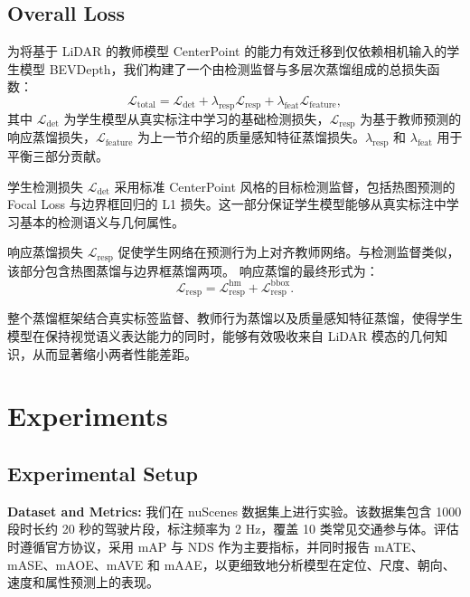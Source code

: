 \documentclass[12pt, UTF8]{ctexart}
\begin{document}
\subsection{Overall Loss}

为将基于 LiDAR 的教师模型 CenterPoint 的能力有效迁移到仅依赖相机输入的学生模型 BEVDepth，我们构建了一个由检测监督与多层次蒸馏组成的总损失函数：
\begin{equation}
\mathcal{L}_{\text{total}}
=
\mathcal{L}_{\text{det}}
+
\lambda_{\text{resp}}
\mathcal{L}_{\text{resp}}
+
\lambda_{\text{feat}}
\mathcal{L}_{\text{feature}},
\end{equation}
其中 $\mathcal{L}_{\text{det}}$ 为学生模型从真实标注中学习的基础检测损失，$\mathcal{L}_{\text{resp}}$ 为基于教师预测的响应蒸馏损失，$\mathcal{L}_{\text{feature}}$ 为上一节介绍的质量感知特征蒸馏损失。$\lambda_{\text{resp}}$ 和 $\lambda_{\text{feat}}$ 用于平衡三部分贡献。


学生检测损失 $\mathcal{L}_{\text{det}}$ 采用标准 CenterPoint 风格的目标检测监督，包括热图预测的 Focal Loss 与边界框回归的 L1 损失。这一部分保证学生模型能够从真实标注中学习基本的检测语义与几何属性。

响应蒸馏损失 $\mathcal{L}_{\text{resp}}$ 促使学生网络在预测行为上对齐教师网络。与检测监督类似，该部分包含热图蒸馏与边界框蒸馏两项。
响应蒸馏的最终形式为：
\begin{equation}
\mathcal{L}_{\text{resp}}
=
\mathcal{L}_{\text{resp}}^{\text{hm}}
+
\mathcal{L}_{\text{resp}}^{\text{bbox}} .
\end{equation}

整个蒸馏框架结合真实标签监督、教师行为蒸馏以及质量感知特征蒸馏，使得学生模型在保持视觉语义表达能力的同时，能够有效吸收来自 LiDAR 模态的几何知识，从而显著缩小两者性能差距。


\section{Experiments}
\subsection{Experimental Setup}
\vspace{0.5em} %
\noindent\textbf{Dataset and Metrics:} 我们在 nuScenes 数据集上进行实验。该数据集包含 1000 段时长约 20 秒的驾驶片段，标注频率为 2 Hz，覆盖 10 类常见交通参与体。评估时遵循官方协议，采用 mAP 与 NDS 作为主要指标，并同时报告 mATE、mASE、mAOE、mAVE 和 mAAE，以更细致地分析模型在定位、尺度、朝向、速度和属性预测上的表现。
\end{document}
